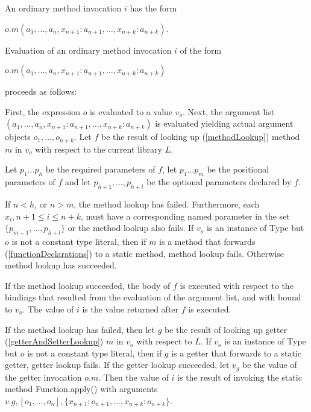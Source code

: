 \documentclass{article}
\newcommand{\code}[1]{{\sf #1}}
\begin{document}
\LMHash{}
An ordinary method invocation $i$ has the form 

$o.m(a_1, \ldots , a_n, x_{n+1}: a_{n+1}, \ldots , x_{n+k}: a_{n+k})$.

\LMHash{}
Evaluation of an ordinary method invocation $i$ of the form 

$o.m(a_1, \ldots , a_n, x_{n+1}: a_{n+1}, \ldots , x_{n+k}: a_{n+k})$ 

proceeds as follows:

\LMHash{}
First, the expression $o$ is evaluated to a value $v_o$. Next, the argument list $(a_1, \ldots , a_n, x_{n+1}: a_{n+1}, \ldots , x_{n+k}: a_{n+k})$ is evaluated yielding actual argument objects $o_1, \ldots , o_{n+k}$. Let $f$ be the result of looking up (\ref{methodLookup}) method $m$  in $v_o$ with respect to the current library $L$. 

\LMHash{}
Let $p_1 \ldots p_h$ be the required parameters of $f$,  let $p_1 \ldots p_m$ be the positional parameters of $f$ and let $p_{h+1}, \ldots, p_{h+l}$ be the optional parameters declared by $f$.


\LMHash{}
If  $n < h$, or $n > m$, the method lookup has failed. Furthermore, each $x_i, n+1 \le i \le n+k$,  must have a corresponding named parameter in the set $\{p_{m+1}, \ldots, p_{h+l}\}$ or the method lookup also fails.  If $v_o$ is an instance of \code{Type} but $o$ is not a constant type literal, then if $m$ is a method that forwards (\ref{functionDeclarations}) to a static method, method lookup fails. Otherwise method lookup has succeeded.

\LMHash{}
If the method lookup succeeded, the body of $f$ is executed with respect to the bindings that resulted from the evaluation of the argument list, and with \THIS{} bound to $v_o$. The value of $i$ is the value returned after $f$ is executed.

\LMHash{}
If the method lookup has failed, then let $g$ be the result of looking up getter (\ref{getterAndSetterLookup}) $m$ in $v_o$ with respect to $L$. 
If $v_o$ is an instance of \code{Type} but $o$ is not a constant type literal, then if $g$ is a getter that forwards to a static getter, getter lookup fails.
If the getter lookup succeeded, let $v_g$ be the value of the getter invocation $o.m$. Then the value of $i$ is the result of invoking 
the static method \code{Function.apply()} with arguments $v.g, [o_1, \ldots , o_n], \{x_{n+1}: o_{n+1}, \ldots , x_{n+k}: o_{n+k}\}$.
\end{document}
